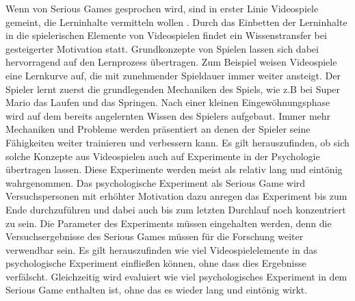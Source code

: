 
Wenn von Serious Games gesprochen wird, sind in erster Linie Videospiele gemeint, die Lerninhalte vermitteln wollen \cite{susi2007serious}. Durch das Einbetten der Lerninhalte  in die spielerischen Elemente von Videospielen findet ein Wissenstransfer bei gesteigerter Motivation statt. Grundkonzepte von Spielen lassen sich dabei hervorragend auf den Lernprozess übertragen. Zum Beispiel weisen Videospiele eine Lernkurve auf, die mit zunehmender Spieldauer immer weiter ansteigt. Der Spieler lernt zuerst die grundlegenden Mechaniken des Spiels, wie z.B bei Super Mario das Laufen und das Springen. Nach einer kleinen Eingewöhnungsphase wird auf dem bereits angelernten Wissen des Spielers aufgebaut. Immer mehr Mechaniken und Probleme werden präsentiert an denen der Spieler seine Fähigkeiten weiter trainieren und verbessern kann. Es gilt herauszufinden, ob sich solche Konzepte aus Videospielen auch auf Experimente in der Psychologie übertragen lassen. Diese Experimente werden meist als relativ lang und eintönig wahrgenommen. Das psychologische Experiment als Serious Game wird Versuchspersonen mit erhöhter Motivation dazu anregen das Experiment bis zum Ende durchzuführen und dabei auch bis zum letzten Durchlauf noch konzentriert zu sein. Die Parameter des Experiments müssen eingehalten werden, denn die Versuchsergebnisse des Serious Games müssen für die Forschung weiter verwendbar sein.
Es gilt herauszufinden wie viel Videospielelemente in das psychologische Experiment einfließen können, ohne dass dies Ergebnisse verfälscht. Gleichzeitig wird evaluiert wie viel psychologisches Experiment in dem Serious Game enthalten ist, ohne das es wieder lang und eintönig wirkt.


